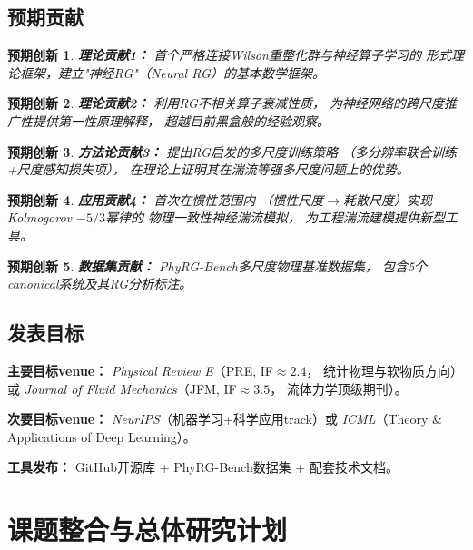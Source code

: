 \documentclass[12pt,a4paper,twoside]{article}
\newtheorem{innovation}{预期创新}[section]
\begin{document}
\begin{inversation}
\subsection{预期贡献}

\begin{innovation}
\textbf{理论贡献1：} 首个严格连接Wilson重整化群与神经算子学习的
形式理论框架，建立"神经RG"（Neural RG）的基本数学框架。
\end{innovation}

\begin{innovation}
\textbf{理论贡献2：} 利用RG不相关算子衰减性质，
为神经网络的跨尺度推广性提供第一性原理解释，
超越目前黑盒般的经验观察。
\end{innovation}

\begin{innovation}
\textbf{方法论贡献3：} 提出RG启发的多尺度训练策略
（多分辨率联合训练+尺度感知损失项），
在理论上证明其在湍流等强多尺度问题上的优势。
\end{innovation}

\begin{innovation}
\textbf{应用贡献4：} 首次在惯性范围内
（惯性尺度$\to$耗散尺度）实现Kolmogorov $-5/3$幂律的
物理一致性神经湍流模拟，
为工程湍流建模提供新型工具。
\end{innovation}

\begin{innovation}
\textbf{数据集贡献：} PhyRG-Bench多尺度物理基准数据集，
包含5个canonical系统及其RG分析标注。
\end{innovation}

\subsection{发表目标}

\textbf{主要目标venue：}
\textit{Physical Review E}（PRE, IF$\approx 2.4$，
统计物理与软物质方向）或
\textit{Journal of Fluid Mechanics}（JFM, IF$\approx 3.5$，
流体力学顶级期刊）。

\textbf{次要目标venue：}
\textit{NeurIPS}（机器学习+科学应用track）或
\textit{ICML}（Theory \& Applications of Deep Learning）。

\textbf{工具发布：}
GitHub开源库 + PhyRG-Bench数据集 + 配套技术文档。

\clearpage

\section*{课题整合与总体研究计划}

\end{inversation}
\end{document}
